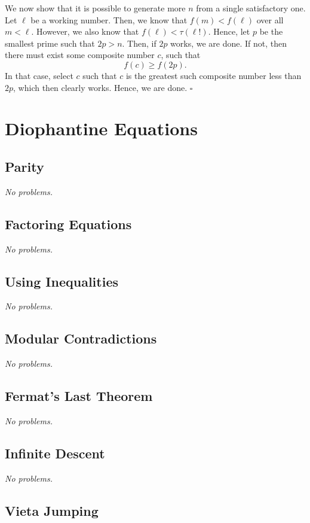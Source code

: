 \documentclass{article}
\newcommand{\noproblems}{\emph{No problems.}}
\begin{document}
We now show that it is possible to generate more $n$ from a single satisfactory one. Let $\ell$ be a working number. Then, we know that $f(m) < f(\ell)$ over all $m < \ell$. However, we also know that $f(\ell) < \tau(\ell!)$. Hence, let $p$ be the smallest prime such that $2p > n$. Then, if $2p$ works, we are done. If not, then there must exist some composite number $c$, such that \[f(c) \ge f(2p).\] In that case, select $c$ such that $c$ is the greatest such composite number less than $2p$, which then clearly works. Hence, we are done. $\square$

\newpage

\section{Diophantine Equations}

\subsection{Parity}

\noproblems

\subsection{Factoring Equations}

\noproblems

\subsection{Using Inequalities}

\noproblems

\subsection{Modular Contradictions}

\noproblems

\subsection{Fermat's Last Theorem}

\noproblems

\subsection{Infinite Descent}

\noproblems

\subsection{Vieta Jumping}
\end{document}
